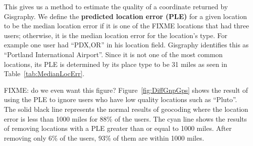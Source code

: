 This gives us a method to estimate the quality of a coordinate returned by
Gisgraphy.
We define the \textbf{predicted location error (PLE)} for a given location to
be the median location error if it is one of the FIXME locations that had three
users; otherwise, it is the median location error for the location's type.
For example one user had ``PDX,OR'' in his location field. Gisgraphy identifies
this as ``Portland International Airport''. Since it is not one of the most
common locations, its PLE is determined by its place type to be 31 miles as
seen in Table~\ref{tab:MedianLocErr}.

FIXME: do we even want this figure?
Figure~\ref{fig:DiffGnpGps} shows the result of using the PLE to ignore users
who have low quality locations such as ``Pluto''.
The solid black line represents the normal results of geocoding where the
location error is less than 1000 miles for 88\% of the users.
The cyan line shows the results of removing locations with a PLE greater than
or equal to 1000 miles.
After removing only 6\% of the users, 93\% of them are within 1000 miles.
